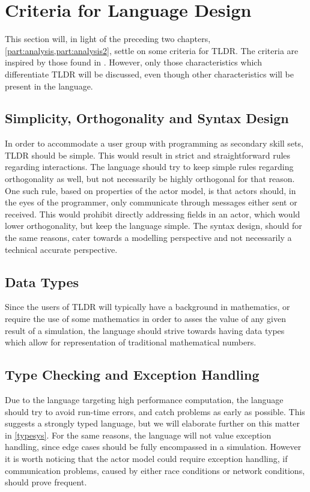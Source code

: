 \section{Criteria for Language Design}\label{analsum}

This section will, in light of the preceding two chapters, \cref{part:analysis,part:analysis2}, settle on some criteria for TLDR. The criteria are inspired by those found in \cite{sebesta2015concepts}. However, only those characteristics which differentiate TLDR will be discussed, even though other characteristics will be present in the language.


\subsection{Simplicity, Orthogonality and Syntax Design}

In order to accommodate a user group with programming as secondary skill sets, TLDR should be simple. This would result in strict and straightforward rules regarding interactions. The language should try to keep simple rules regarding orthogonality as well, but not necessarily be highly orthogonal for that reason. One such rule, based on properties of the actor model, is that actors should, in the eyes of the programmer, only communicate through messages either sent or received. This would prohibit directly addressing fields in an actor, which would lower orthogonality, but keep the language simple. The syntax design, should for the same reasons, cater towards a modelling perspective and not necessarily a technical accurate perspective.

\subsection{Data Types}

Since the users of TLDR will typically have a background in mathematics, or require  the use of some mathematics in order to asses the value of any given result of a simulation, the language should strive towards having data types which allow for representation of traditional mathematical numbers.


\subsection{Type Checking and Exception Handling}

Due to the language targeting high performance computation, the language should try to avoid run-time errors, and catch problems as early as possible. This suggests a strongly typed language, but we will elaborate further on this matter in \cref{typesys}. For the same reasons, the language will not value exception handling, since edge cases should be fully encompassed in a simulation. However it is worth noticing that the actor model could require exception handling, if communication problems, caused by either race conditions or network conditions, should prove frequent.


